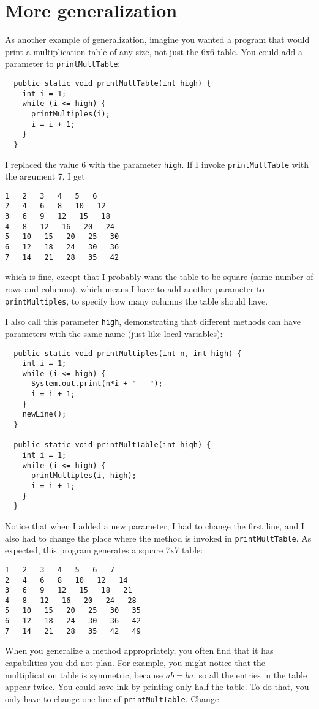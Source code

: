 \documentclass[12pt]{book}
\theoremstyle{definition}
\begin{document}

\section{More generalization}

As another example of generalization, imagine you wanted
a program that would print a multiplication table of any
size, not just the 6x6 table.  You could add a parameter to
{\tt printMultTable}:

\begin{lstlisting}
  public static void printMultTable(int high) {
    int i = 1;
    while (i <= high) {
      printMultiples(i);
      i = i + 1;
    }
  }
\end{lstlisting}
%
I replaced the value 6 with the parameter {\tt high}.  If I
invoke {\tt printMultTable} with the argument 7, I get

\begin{lstlisting}
1   2   3   4   5   6   
2   4   6   8   10   12   
3   6   9   12   15   18   
4   8   12   16   20   24   
5   10   15   20   25   30   
6   12   18   24   30   36   
7   14   21   28   35   42   
\end{lstlisting}
%
which is fine, except that I probably want the table to
be square (same number of rows and columns), which means
I have to add another parameter to {\tt printMultiples},
to specify how many columns the table should have.

I also call this parameter {\tt high},
demonstrating that different methods can have parameters
with the same name (just like local variables):

\begin{lstlisting}
  public static void printMultiples(int n, int high) {
    int i = 1;
    while (i <= high) {
      System.out.print(n*i + "   ");
      i = i + 1;
    }    
    newLine();
  }

  public static void printMultTable(int high) {
    int i = 1;
    while (i <= high) {
      printMultiples(i, high);
      i = i + 1;
    }
  }
\end{lstlisting}
%
Notice that when I added a new parameter, I had to change the first
line, and I also had to
change the place where the method is invoked in {\tt printMultTable}.
As expected, this program generates a square 7x7 table:

\begin{lstlisting}
1   2   3   4   5   6   7   
2   4   6   8   10   12   14   
3   6   9   12   15   18   21   
4   8   12   16   20   24   28   
5   10   15   20   25   30   35   
6   12   18   24   30   36   42   
7   14   21   28   35   42   49
\end{lstlisting}
%
When you generalize a method appropriately, you often find
that it has capabilities you did not plan.
For example, you might notice that the multiplication table
is symmetric, because $ab = ba$, so all the entries in the
table appear twice.  You could save ink by printing only
half the table.  To do that, you only have to change one
line of {\tt printMultTable}.  Change
\end{document}
